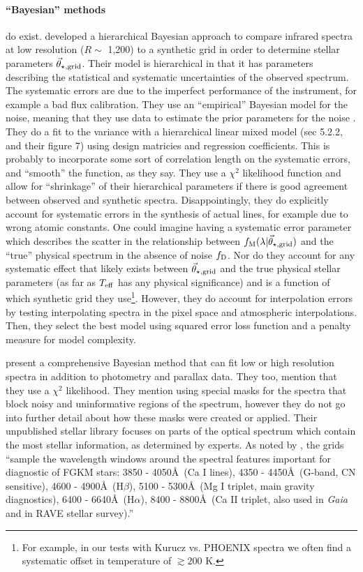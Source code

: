\documentclass[preprint]{aastex} %
\newcommand{\vt}{\vec{\theta}}
\newcommand{\vg}{\vt_{\star, {\rm grid}}}
\newcommand{\fM}{f_{\rm M}}
\newcommand{\fD}{f_{\rm D}}
\begin{document}
\paragraph{``Bayesian'' methods} do exist. \citet{sdm+07} developed a hierarchical Bayesian approach to compare infrared spectra at low resolution ($R \sim $ 1,200) to a synthetic grid in order to determine stellar parameters $\vg$. Their model is hierarchical in that it has parameters describing the statistical and systematic uncertainties of the observed spectrum. The systematic errors are due to the imperfect performance of the instrument, for example a bad flux calibration. They use an ``empirical'' Bayesian model for the noise, meaning that they use data to estimate the prior parameters for the noise \citep{gcs+04}. They do a fit to the variance with a hierarchical linear mixed model (sec 5.2.2, and their figure 7) using design matricies and regression coefficients. This is probably to incorporate some sort of correlation length on the systematic errors, and ``smooth'' the function, as they say. They use a $\chi^2$ likelihood function and allow for ``shrinkage'' of their hierarchical parameters if there is good agreement between observed and synthetic spectra. Disappointingly, they do explicitly account for systematic errors in the synthesis of actual lines, for example due to wrong atomic constants. One could imagine having a systematic error parameter which describes the scatter in the relationship between $\fM(\lambda | \vg)$ and the ``true'' physical spectrum in the absence of noise $\fD$. Nor do they account for any systematic effect that likely exists between $\vg$ and the true physical stellar parameters (as far as $T_{\rm eff}$ has any physical significance) and is a function of which synthetic grid they use\footnote{For example, in our tests with Kurucz vs. PHOENIX spectra we often find a systematic offset in temperature of $\gtrsim 200$ K.}. However, they do account for interpolation errors by testing interpolating spectra in the pixel space and atmospheric interpolations. Then, they select the best model using squared error loss function and a penalty measure for model complexity.

\citet{sb13} present a comprehensive Bayesian method that can fit low or high resolution spectra in addition to photometry and parallax data. They too, mention that they use a $\chi^2$ likelihood. They mention using special masks for the spectra that block noisy and uninformative regions of the spectrum, however they do not go into further detail about how these masks were created or applied. Their unpublished stellar library focuses on parts of the optical spectrum which contain the most stellar information, as determined by experts. As noted by \citet{sb13}, the grids ``sample the wavelength windows around the spectral features important for diagnostic of FGKM stars: 3850 - 4050\AA\ (Ca I lines), 4350 - 4450\AA\ (G-band, CN sensitive), 4600 - 4900\AA\ (H$\beta$), 5100 - 5300\AA\ (Mg I triplet, main gravity diagnostics), 6400 - 6640\AA\ (H$\alpha$), 8400 - 8800\AA\ (Ca II triplet, also used in \emph{Gaia} and in RAVE stellar survey).'' 
\end{document}
